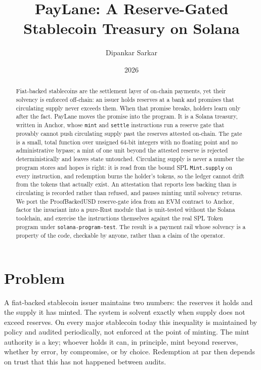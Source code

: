 \documentclass[10pt,twocolumn]{article}
\title{\textbf{PayLane: A Reserve-Gated Stablecoin Treasury on Solana}}
\author{Dipankar Sarkar}
\date{2026}
\begin{document}
\maketitle

\begin{abstract}
Fiat-backed stablecoins are the settlement layer of on-chain payments, yet their
solvency is enforced off-chain: an issuer holds reserves at a bank and promises
that circulating supply never exceeds them. When that promise breaks, holders
learn only after the fact. PayLane moves the promise into the program. It is a
Solana treasury, written in Anchor, whose \texttt{mint} and \texttt{settle}
instructions run a reserve gate that provably cannot push circulating supply past
the reserves attested on-chain. The gate is a small, total function over unsigned
64-bit integers with no floating point and no administrative bypass; a mint of one
unit beyond the attested reserve is rejected deterministically and leaves state
untouched. Circulating supply is never a number the program stores and hopes is
right: it is read from the bound SPL \texttt{Mint.supply} on every instruction, and
redemption burns the holder's tokens, so the ledger cannot drift from the tokens
that actually exist. An attestation that reports less backing than is circulating
is recorded rather than refused, and pauses minting until solvency returns. We port
the ProofBackedUSD reserve-gate idea from an EVM contract to Anchor, factor the
invariant into a pure-Rust module that is unit-tested without the Solana toolchain,
and exercise the instructions themselves against the real SPL Token program under
\texttt{solana-program-test}. The result is a payment rail whose solvency is a
property of the code, checkable by anyone, rather than a claim of the operator.
\end{abstract}

\section{Problem}
A fiat-backed stablecoin issuer maintains two numbers: the reserves it holds and
the supply it has minted. The system is solvent exactly when supply does not
exceed reserves. On every major stablecoin today this inequality is maintained by
policy and audited periodically, not enforced at the point of minting. The mint
authority is a key; whoever holds it can, in principle, mint beyond reserves,
whether by error, by compromise, or by choice. Redemption at par then depends on
trust that this has not happened between audits.
\end{document}
